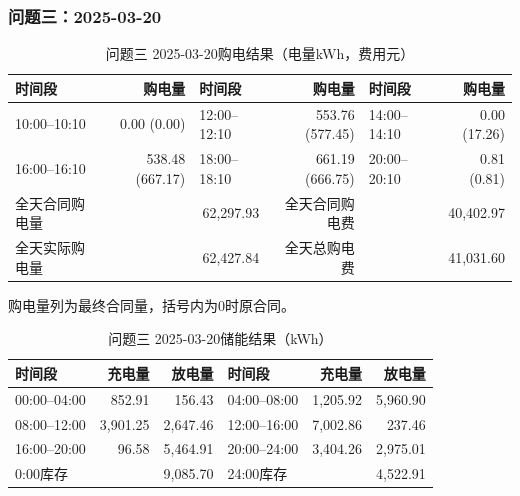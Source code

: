 \par\noindent\begin{minipage}{\textwidth}
\subsubsection*{问题三：2025-03-20}
\begin{table}[H]\centering\small\setlength{\tabcolsep}{4pt}\caption{问题三 2025-03-20购电结果（电量kWh，费用元）}
\begin{tabular}{lr lr lr}\toprule
时间段 & 购电量 & 时间段 & 购电量 & 时间段 & 购电量\\\midrule
10:00--10:10 & 0.00 (0.00) & 12:00--12:10 & 553.76 (577.45) & 14:00--14:10 & 0.00 (17.26)\\
16:00--16:10 & 538.48 (667.17) & 18:00--18:10 & 661.19 (666.75) & 20:00--20:10 & 0.81 (0.81)\\
\midrule
全天合同购电量 & \multicolumn{2}{r}{62,297.93} & 全天合同购电费 & \multicolumn{2}{r}{40,402.97}\\
全天实际购电量 & \multicolumn{2}{r}{62,427.84} & 全天总购电费 & \multicolumn{2}{r}{41,031.60}\\
\bottomrule\end{tabular}\end{table}
\noindent\small 购电量列为最终合同量，括号内为0时原合同。\normalsize
\begin{table}[H]\centering\small\setlength{\tabcolsep}{4pt}\caption{问题三 2025-03-20储能结果（kWh）}
\begin{tabular}{lrr lrr}\toprule
时间段 & 充电量 & 放电量 & 时间段 & 充电量 & 放电量\\\midrule
00:00--04:00 & 852.91 & 156.43 & 04:00--08:00 & 1,205.92 & 5,960.90\\
08:00--12:00 & 3,901.25 & 2,647.46 & 12:00--16:00 & 7,002.86 & 237.46\\
16:00--20:00 & 96.58 & 5,464.91 & 20:00--24:00 & 3,404.26 & 2,975.01\\
\midrule
0:00库存 & \multicolumn{2}{r}{9,085.70} & 24:00库存 & \multicolumn{2}{r}{4,522.91}\\
\bottomrule\end{tabular}\end{table}
\end{minipage}\par

